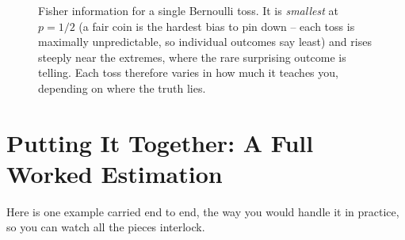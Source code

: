 \begin{figure}[H]
\centering
{}
\caption{Fisher information for a single Bernoulli toss. It is \emph{smallest} at
$p=1/2$ (a fair coin is the hardest bias to pin down -- each toss is maximally
unpredictable, so individual outcomes say least) and rises steeply near the
extremes, where the rare surprising outcome is telling. Each toss therefore
varies in how much it teaches you, depending on where the truth lies.}
\label{ch30:fig-fisher-bern}
\end{figure}

\section{Putting It Together: A Full Worked Estimation}
\label{ch30:worked}

Here is one example carried end to end, the way you would handle it in practice,
so you can watch all the pieces interlock.


